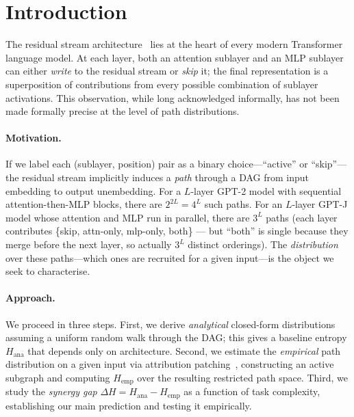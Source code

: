 \documentclass{article}
\newcommand{\Hana}{H_{\mathrm{ana}}}
\newcommand{\Hemp}{H_{\mathrm{emp}}}
\newcommand{\DeltaH}{\Delta H}
\begin{document}
\section{Introduction}
\label{sec:intro}

The residual stream architecture~\citep{elhage2021mathematical} lies at the heart
of every modern Transformer language model.  At each layer, both an attention
sublayer and an MLP sublayer can either \emph{write} to the residual stream or
\emph{skip} it; the final representation is a superposition of contributions from
every possible combination of sublayer activations.  This observation, while
long acknowledged informally, has not been made formally precise at the level of
path distributions.

\paragraph{Motivation.}
If we label each (sublayer, position) pair as a binary choice—``active'' or
``skip''—the residual stream implicitly induces a \emph{path} through a DAG from
input embedding to output unembedding.  For a $L$-layer GPT-2 model with
sequential attention-then-MLP blocks, there are $2^{2L}=4^L$ such paths.
For an $L$-layer GPT-J model whose attention and MLP run in parallel, there are
$3^L$ paths (each layer contributes \{skip, attn-only, mlp-only, both\} — but
``both'' is single because they merge before the next layer, so actually $3^L$
distinct orderings).
The \emph{distribution} over these paths—which ones are recruited for a given
input—is the object we seek to characterise.

\paragraph{Approach.}
We proceed in three steps.  First, we derive \emph{analytical} closed-form
distributions assuming a uniform random walk through the DAG; this gives a
baseline entropy $\Hana$ that depends only on architecture.
Second, we estimate the \emph{empirical} path distribution on a given input via
attribution patching~\citep{nanda2022transformerlens,goldowsky2023localizing},
constructing an active subgraph and computing $\Hemp$ over the resulting restricted
path space.  Third, we study the \emph{synergy gap} $\DeltaH = \Hana - \Hemp$
as a function of task complexity, establishing our main prediction and testing it
empirically.
\end{document}
